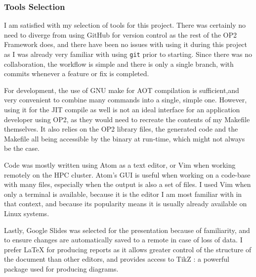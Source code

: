 \subsubsection{Tools Selection}
I am satisfied with my selection of tools for this project. There was certainly no need to diverge from using GitHub for version control as the rest of the OP2 Framework does, and there have been no issues with using it during this project as I was already very familiar with using \verb|git| prior to starting. Since there was no collaboration, the workflow is simple and there is only a single branch, with commits whenever a feature or fix is completed.
\par
For development, the use of GNU make for AOT compilation is sufficient,and very convenient to combine many commands into a single, simple one. However, using it for the JIT compile as well is not an ideal interface for an application developer using OP2, as they would need to recreate the contents of my Makefile themselves. It also relies on the OP2 library files, the generated code and the Makefile all being accessible by the binary at run-time, which might not always be the case.
\par
Code was mostly written using Atom \cite{atom} as a text editor, or Vim \cite{vim} when working remotely on the HPC cluster. Atom's GUI is useful when working on a code-base with many files, especially when the output is also a set of files. I used Vim when only a terminal is available, because it is the editor I am most familiar with in that context, and because its popularity means it is usually already available on Linux systems.
\par
Lastly, Google Slides was selected for the presentation because of familiarity, and to ensure changes are automatically saved to a remote in case of loss of data. I prefer LaTeX for producing reports as it allows greater control of the structure of the document than other editors, and provides access to TikZ \cite{tikz}: a powerful package used for producing diagrams.
